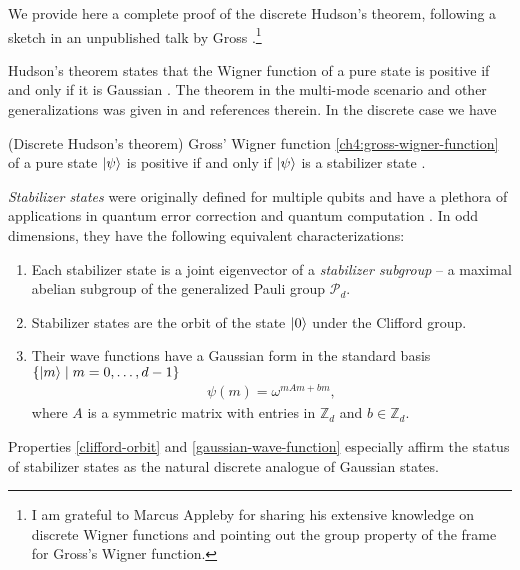 We provide here a complete proof of the discrete Hudson's theorem, following a sketch in an unpublished talk by Gross \cite{gross2015coogee}.\footnote{I am grateful to Marcus Appleby for sharing his extensive knowledge on discrete Wigner functions and pointing out the group property of the frame for Gross's Wigner function.}

Hudson's theorem states that the Wigner function of a pure state is positive if and only if it is Gaussian \cite{hudson_when_1974}. The theorem in the multi-mode scenario and other generalizations was given in \cite{soto_when_1983,toft_hudsons_2006} and references therein. In the discrete case we have

\begin{theorem}{\normalfont (Discrete Hudson's theorem)}
	Gross' Wigner function \eqref{ch4:gross-wigner-function} of a pure state ${\left\vert{\psi}\right\rangle}$ is positive if and only if ${\left\vert{\psi}\right\rangle}$ is a stabilizer state
	{\normalfont \cite{gross_hudsons_2006,gross_non-negative_2007}.}
\end{theorem}

\emph{Stabilizer states} were originally defined for multiple qubits \cite{gottesman_stabilizer_1997} and have a plethora of applications in quantum error correction and quantum computation \cite{fujii2015quantum}.
In odd dimensions, they have the following equivalent characterizations:
\begin{enumerate}
	
	\item\label{def-stabilizer} Each stabilizer state is a joint eigenvector of a \emph{stabilizer subgroup} -- a maximal abelian subgroup of the generalized Pauli group $\mathcal{P}_d$.
	
	\item\label{clifford-orbit} Stabilizer states are the orbit of the state ${\left\vert{0}\right\rangle}$ under the Clifford group.
	
	\item\label{gaussian-wave-function} Their wave functions have a Gaussian form in the standard basis $\{{\left\vert{m}\right\rangle}\mid m=0,\dots, d-1 \}$
	\begin{align}
	\psi(m) = \omega^{mAm + bm},
	\end{align}
	where $A$ is a symmetric matrix with entries in $\mathbb{Z}_d$ and $b \in \mathbb{Z}_d$. %
	
\end{enumerate}
Properties \ref{clifford-orbit} and \ref{gaussian-wave-function} especially affirm the status of stabilizer states as the natural discrete analogue of Gaussian states.

